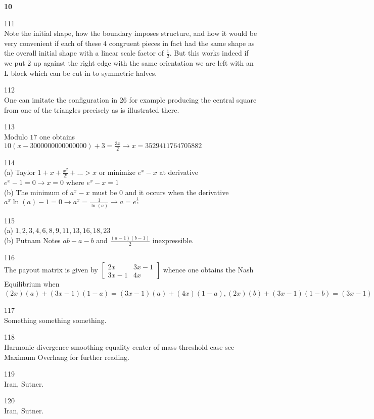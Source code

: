 \newpage

\textbf{10}

111 \\
Note the initial shape, how the boundary imposes structure, and how it would be very convenient if each of these $4$ congruent pieces in fact had the same shape as the overall initial shape with a linear scale factor of $\frac{1}{2}$. But this works indeed if we put $2$ up against the right edge with the same orientation we are left with an L block which can be cut in to symmetric halves.

112 \\
One can imitate the configuration in 26 for example producing the central square from one of the triangles precisely as is illustrated there.

113 \\
Modulo $17$ one obtains $10(x-3000000000000000)+3=\frac{3x}{2} \to x=\boxed{3529411764705882}$

114 \\
(a) Taylor $1+x+\frac{x^2}{2!}+\dots >x$ or minimize $e^x-x$ at derivative $e^x-1=0 \to x=0$ where $e^x-x=1$ \\
(b) The minimum of $a^x-x$ must be $0$ and it occurs when the derivative $a^x\ln(a)-1=0 \to a^x=\frac{1}{\ln(a)} \to a=\boxed{e^{\frac{1}{e}}}$

115 \\
(a) $1,2,3,4,6,8,9,11,13,16,18,23$ \\
(b) Putnam Notes $ab-a-b$ and $\frac{(a-1)(b-1)}{2}$ inexpressible.

116 \\
The payout matrix is given by
$
\begin{bmatrix}
2x & 3x-1 \\
3x-1 & 4x
\end{bmatrix}
$
whence one obtains the Nash Equilibrium when $(2x)(a)+(3x-1)(1-a)=(3x-1)(a)+(4x)(1-a),(2x)(b)+(3x-1)(1-b)=(3x-1)(b)+(4x)(1-b) \to a=b=\frac{x+1}{2} \to x=\boxed{3-2\sqrt{2}}$

117 \\
Something something something.

118 \\
Harmonic divergence smoothing equality center of mass threshold case see Maximum Overhang for further reading.

119 \\
Iran, Sutner.

120 \\
Iran, Sutner.

